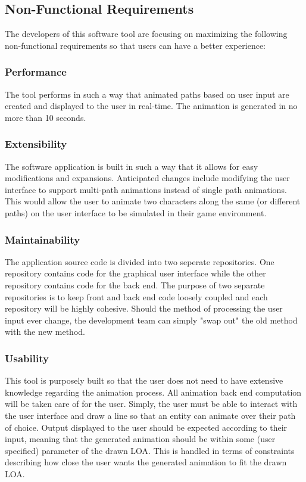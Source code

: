 \subsection{Non-Functional Requirements}
The developers of this software tool are focusing on maximizing the following non-functional requirements so that users can have a better experience:

\subsubsection{Performance}
The tool performs in such a way that animated paths based on user input are created and displayed to the user in real-time. The animation is generated in no more than 10 seconds. 

\subsubsection{Extensibility}
The software application is built in such a way that it allows for easy modifications and expansions. Anticipated changes include modifying the user interface to support multi-path animations instead of single path animations. This would allow the user to animate two characters along the same (or different paths) on the user interface to be simulated in their game environment.

\subsubsection{Maintainability}
The application source code is divided into two seperate repositories. One repository contains code for the graphical user interface while the other repository contains code for the back end. The purpose of two separate repositories is to keep front and back end code loosely coupled and each repository will be highly cohesive. Should the method of processing the user input ever change, the development team can simply "swap out" the old method with the new method.

\subsubsection{Usability}
This tool is purposely built so that the user does not need to have extensive knowledge regarding the animation process. All animation back end computation will be taken care of for the user. Simply, the user must be able to interact with the user interface and draw a line so that an entity can animate over their path of choice. Output displayed to the user should be expected according to their input, meaning that the generated animation should be within some (user specified) parameter of the drawn LOA. This is handled in terms of constraints describing how close the user wants the generated animation to fit the drawn LOA.


